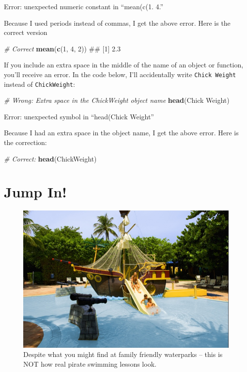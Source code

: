 \documentclass[]{book}
\newenvironment{Shaded}{\begin{snugshade}}{\end{snugshade}}
\newcommand{\KeywordTok}[1]{\textcolor[rgb]{0.13,0.29,0.53}{\textbf{{#1}}}}
\newcommand{\DecValTok}[1]{\textcolor[rgb]{0.00,0.00,0.81}{{#1}}}
\newcommand{\CommentTok}[1]{\textcolor[rgb]{0.56,0.35,0.01}{\textit{{#1}}}}
\newcommand{\NormalTok}[1]{{#1}}
\theoremstyle{definition}
\theoremstyle{definition}
\theoremstyle{remark}
\begin{document}
Error: unexpected numeric constant in ``mean(c(1. 4.''

Because I used periods instead of commas, I get the above error. Here is
the correct version

\begin{Shaded}
\begin{Highlighting}[]
\CommentTok{# Correct}
\KeywordTok{mean}\NormalTok{(}\KeywordTok{c}\NormalTok{(}\DecValTok{1}\NormalTok{, }\DecValTok{4}\NormalTok{, }\DecValTok{2}\NormalTok{))}
\NormalTok{## [1] 2.3}
\end{Highlighting}
\end{Shaded}

If you include an extra space in the middle of the name of an object or
function, you'll receive an error. In the code below, I'll accidentally
write \texttt{Chick\ Weight} instead of \texttt{ChickWeight}:

\begin{Shaded}
\begin{Highlighting}[]
\CommentTok{# Wrong: Extra space in the ChickWeight object name}
\KeywordTok{head}\NormalTok{(Chick Weight)}
\end{Highlighting}
\end{Shaded}

Error: unexpected symbol in ``head(Chick Weight''

Because I had an extra space in the object name, I get the above error.
Here is the correction:

\begin{Shaded}
\begin{Highlighting}[]
\CommentTok{# Correct:}
\KeywordTok{head}\NormalTok{(ChickWeight)}
\end{Highlighting}
\end{Shaded}

\chapter{Jump In!}\label{jumpin}

\begin{figure}

{\centering \includegraphics[width=0.75\linewidth]{images/pirateswimming} 

}

\caption{Despite what you might find at family friendly waterparks -- this is NOT how real pirate swimming lessons look.}\label{fig:unnamed-chunk-30}
\end{figure}
\end{document}
